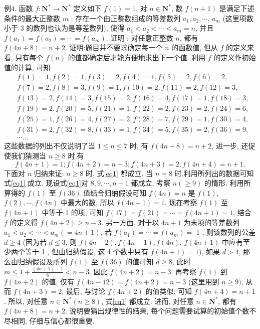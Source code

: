 例4. 函数 $f: \mathbf{N}^* \rightarrow \mathbf{N}^*$ 定义如下 $f(1)=1$, 对 $n \in \mathbf{N}^*$, 数 $f(n+1)$ 是满足下述条件的最大正整数 $m$ : 存在一个由正整数组成的等差数列 $a_1, a_2, \cdots$, $a_m$ (这里项数小于 3 的数列也认为是等差数列), 使得 $a_1<a_2<\cdots<a_m=n$, 并且 $f\left(a_1\right)=f\left(a_2\right)=\cdots=f\left(a_m\right)$. 证明 : 对任意正整数 $n$, 都有 $f(4 n+8)= n+2$.
证明:题目并不要求确定每一个 $n$ 的函数值, 但从 $f$ 的定义来看, 只有每个 $f(n)$ 的值都确定后才能方便地求出下一个值.
利用 $f$ 的定义作初始值的计算, 可知
$$
\begin{aligned}
& f(1)=1, f(2)=1, f(3)=2, f(4)=1, f(5)=2, f(6)=2, \\
& f(7)=2, f(8)=3, f(9)=1, f(10)=2, f(11)=2, f(12)=3, \\
& f(13)=2, f(14)=3, f(15)=2, f(16)=4, f(17)=1, f(18)=3, \\
& f(19)=2, f(20)=5, f(21)=1, f(22)=2, f(23)=2, f(24)=6, \\
& f(25)=1, f(26)=4, f(27)=2, f(28)=7, f(29)=1, f(30)=4, \\
& f(31)=2, f(32)=8, f(33)=1, f(34)=5, f(35)=2, f(36)=9, \\
& \cdots . . .
\end{aligned}
$$
这些数据的列出不仅说明了当 $1 \leqslant n \leqslant 7$ 时, 有 $f(4 n+8)=n+2$, 进一步, 还促使我们猜测当 $n \geqslant 8$ 时,有
$$
f(4 n+1)=1 ; f(4 n+2)=n-3 ; f(4 n+3)=2 ; f(4 n+4)=n+1 . \label{eq1}
$$
下面对 $n$ 归纳来证: $n \geqslant 8$ 时, 式\ref{eq1} 都成立.
当 $n=8$ 时,利用所列出的数据可知 式\ref{eq1} 成立.
现设式\ref{eq1}对 $8,9, \cdots, n-1$ 都成立, 考察 $n(\geqslant 9)$ 的情形.
利用所算得的 $f(1)$ 至 $f(36)$ 值结合归纳假设可知 $f(4 n)=n$ 是 $f(1)$, $f(2), \cdots, f(4 n)$ 中最大的数, 所以 $f(4 n+1)=1$.
现在考察 $f(1)$ 至 $f(4 n+1)$ 中等于 1 的项, 可知 $f(17)=f(21)=\cdots= f(4 n+1)=1$, 结合 $f$ 的定义得 $f(4 n+2) \geqslant n-3$. 另一方面, 对于以 $4 n+1$ 为末项的等差数列 $a_1<a_2<\cdots<a_m(=4 n+1)$, 若 $f\left(a_1\right)=\cdots=f\left(a_m\right)=$ 1 , 则该数列的公差 $d \geqslant 4$ (因为若 $d \leqslant 3$, 则 $f(4 n-2), f(4 n-1), f(4 n)$, $f(4 n+1)$ 中应有至少两个等于 1 , 但由归纳假设, 这 4 个数中只有 $f(4 n+ 1)=1)$, 如果 $d>4$, 那么由归纳假设及所列 $f(1)$ 至 $f(36)$ 的值可知 $d \geqslant 8$, 此时 $m \leqslant 1+\frac{(4 n+1)-1}{8}<n-3$. 因此 $f(4 n+2)=n-3$.
再考察 $f(1)$ 到 $f(4 n+2)$ 的值, 仅有 $f(4 n-12)=f(4 n+2)=n-3$ (这里用到 $n \geqslant 9)$, 从而 $f(4 n+3)=2$.
最后, 与讨论 $f(4 n+2)$ 的值类似, 可知 $f(4 n+4)=n+1$.
所以, 对任意 $n \in \mathbf{N}^*(n \geqslant 8)$, 式\ref{eq1} 都成立.
进而, 对任意 $n \in \mathbf{N}^*$, 都有 $f(4 n+8)=n+2$.
说明要猜出规律性的结果, 每个问题需要试算的初始值个数不尽相同, 仔细与信心都很重要.



